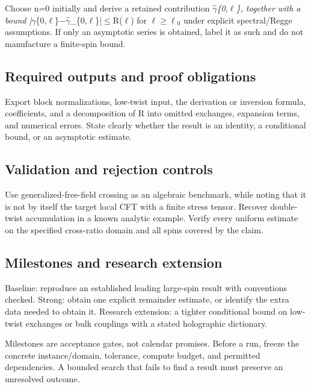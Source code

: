 \documentclass[
  11pt,
]{article}
\begin{document}
Choose n=0 initially and derive a retained contribution
\ensuremath{\hat{\gamma}}\emph{\{0,\ensuremath{\ell}\}, together with a
bound
|\ensuremath{\gamma}}\{0,\ensuremath{\ell}\}\ensuremath{-}\ensuremath{\hat{\gamma}}\_\{0,\ensuremath{\ell}\}|\ensuremath{\le}R(\ensuremath{\ell})
for
\ensuremath{\ell}\ensuremath{\ge}\ensuremath{\ell}\ensuremath{{}_{0}}
under explicit spectral/Regge assumptions. If only an asymptotic series
is obtained, label it as such and do not manufacture a finite-spin
bound.

\subsection{Required outputs and proof obligations}

Export block normalizations, low-twist input, the derivation or
inversion formula, coefficients, and a decomposition of R into omitted
exchanges, expansion terms, and numerical errors. State clearly whether
the result is an identity, a conditional bound, or an asymptotic
estimate.

\subsection{Validation and rejection controls}

Use generalized-free-field crossing as an algebraic benchmark, while
noting that it is not by itself the target local CFT with a finite
stress tensor. Recover double-twist accumulation in a known analytic
example. Verify every uniform estimate on the specified cross-ratio
domain and all spins covered by the claim.

\subsection{Milestones and research extension}

Baseline: reproduce an established leading large-spin result with
conventions checked. Strong: obtain one explicit remainder estimate, or
identify the extra data needed to obtain it. Research extension: a
tighter conditional bound on low-twist exchanges or bulk couplings with
a stated holographic dictionary.

Milestones are acceptance gates, not calendar promises. Before a run,
freeze the concrete instance/domain, tolerance, compute budget, and
permitted dependencies. A bounded search that fails to find a result
must preserve an unresolved outcome.
\end{document}
